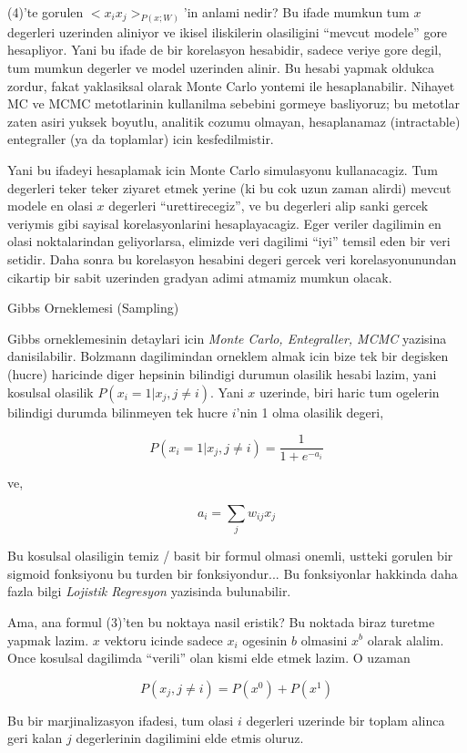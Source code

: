 \documentclass[12pt,fleqn]{article}\usepackage{../common}
\begin{document}
(4)'te gorulen $<x_ix_j>_{P(x;W)}$'in anlami nedir? Bu ifade mumkun tum $x$
degerleri uzerinden aliniyor ve ikisel iliskilerin olasiligini ``mevcut
modele'' gore hesapliyor. Yani bu ifade de bir korelasyon hesabidir, sadece
veriye gore degil, tum mumkun degerler ve model uzerinden alinir. Bu hesabi
yapmak oldukca zordur, fakat yaklasiksal olarak Monte Carlo yontemi ile
hesaplanabilir. Nihayet MC ve MCMC metotlarinin kullanilma sebebini gormeye
basliyoruz; bu metotlar zaten asiri yuksek boyutlu, analitik cozumu
olmayan, hesaplanamaz (intractable) entegraller (ya da toplamlar) icin
kesfedilmistir. 

Yani bu ifadeyi hesaplamak icin Monte Carlo simulasyonu kullanacagiz. Tum
degerleri teker teker ziyaret etmek yerine (ki bu cok uzun zaman alirdi)
mevcut modele en olasi $x$ degerleri ``urettirecegiz'', ve bu degerleri
alip sanki gercek veriymis gibi sayisal korelasyonlarini
hesaplayacagiz. Eger veriler dagilimin en olasi noktalarindan geliyorlarsa,
elimizde veri dagilimi ``iyi'' temsil eden bir veri setidir. Daha sonra bu
korelasyon hesabini degeri gercek veri korelasyonunundan cikartip bir sabit
uzerinden gradyan adimi atmamiz mumkun olacak.

Gibbs Orneklemesi (Sampling)

Gibbs orneklemesinin detaylari icin {\em Monte Carlo, Entegraller, MCMC}
yazisina danisilabilir. Bolzmann dagilimindan orneklem almak icin bize tek
bir degisken (hucre) haricinde diger hepsinin bilindigi durumun olasilik
hesabi lazim, yani kosulsal olasilik $P(x_i = 1 | x_j, j \ne i)$. Yani $x$
uzerinde, biri haric tum ogelerin bilindigi durumda bilinmeyen tek hucre
$i$'nin 1 olma olasilik degeri,

$$ P(x_i = 1 | x_j, j \ne i) = \frac{1}{1 + e^{-a_i}} $$

ve,

$$ a_i = \sum_j  w_{ij}x_j $$

Bu kosulsal olasiligin temiz / basit bir formul olmasi onemli, ustteki
gorulen bir sigmoid fonksiyonu bu turden bir fonksiyondur... Bu
fonksiyonlar hakkinda daha fazla bilgi {\em Lojistik Regresyon} yazisinda
bulunabilir.

Ama, ana formul (3)'ten bu noktaya nasil eristik? Bu noktada biraz turetme
yapmak lazim. $x$ vektoru icinde sadece $x_i$ ogesinin $b$ olmasini $x^b$ olarak
alalim. Once kosulsal dagilimda ``verili'' olan kismi elde etmek lazim. O
uzaman

$$ P(x_j,j \ne i) = P(x^0) + P(x^1) $$

Bu bir marjinalizasyon ifadesi, tum olasi $i$ degerleri uzerinde bir toplam
alinca geri kalan $j$ degerlerinin dagilimini elde etmis oluruz. 
\end{document}
